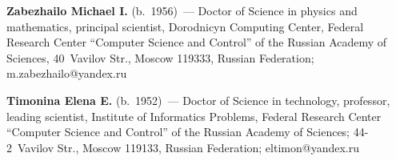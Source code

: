 \vspace*{6pt}

\noindent
\textbf{Zabezhailo Michael I.} (b.\ 1956)~--- Doctor of Science in physics and mathematics, principal 
scientist, Dorodnicyn Computing Center, Federal Research Center 
``Computer Science and Control'' of the Russian Academy of Sciences, 40~Vavilov Str., Moscow 119333, 
Russian Federation; \mbox{m.zabezhailo@yandex.ru}

\vspace*{6pt}

\noindent
\textbf{Timonina Elena E.} (b.\ 1952)~--- 
Doctor of Science in technology, professor, leading scientist, Institute of Informatics 
Problems, Federal Research Center ``Computer Science and Control'' 
of the Russian Academy of Sciences; 44-2~Vavilov Str., Moscow 119133, Russian Federation; 
\mbox{eltimon@yandex.ru}



\label{end\stat}

\renewcommand{\bibname}{\protect\rm Литература} 
